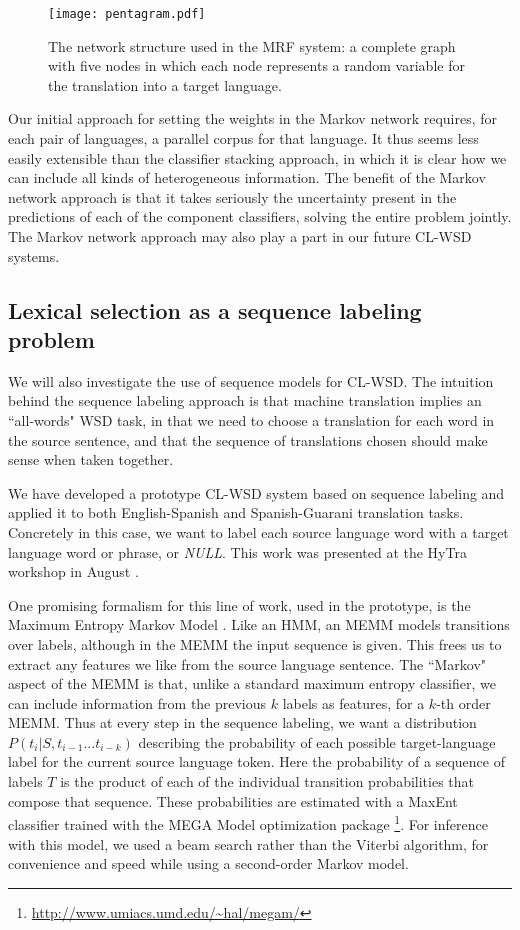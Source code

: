 \begin{figure}
  \begin{center}
  \texttt{[image: pentagram.pdf]}
  \end{center}
  \caption{The network structure used in the MRF system: a complete graph with
  five nodes in which each node represents a random variable for the
  translation into a target language.}
  \label{fig:pentagram}
\end{figure}

Our initial approach for setting the weights in the Markov network requires,
for each pair of languages, a parallel corpus for that language. It thus seems
less easily extensible than the classifier stacking approach, in which it is
clear how we can include all kinds of heterogeneous information.
The benefit of the Markov network approach is that it takes seriously the
uncertainty present in the predictions of each of the component classifiers,
solving the entire problem jointly.
The Markov network approach may also play a part in our future CL-WSD systems.

\subsection{Lexical selection as a sequence labeling problem}
We will also investigate the use of sequence models for CL-WSD.
The intuition behind the sequence labeling approach is that machine translation
implies an ``all-words" WSD task, in that we need to choose a translation for
each word in the source sentence, and that the sequence of translations chosen
should make sense when taken together.

We have developed a prototype CL-WSD system based on sequence labeling and
applied it to both English-Spanish and Spanish-Guarani translation tasks.
Concretely in this case, we want to label each source language word with a
target language word or phrase, or \emph{NULL}.
This work was presented at the HyTra workshop in August
\cite{rudnick-gasser:2013:HyTra-2013}.

One promising formalism for this line of work, used in the prototype, is the
Maximum Entropy Markov Model \cite{icml00/mccallum}.
Like an HMM, an MEMM models transitions over labels, although in the MEMM the
input sequence is given.
This frees us to extract any features we like from the source language
sentence. The ``Markov" aspect of the MEMM is that, unlike a standard maximum
entropy classifier, we can include information from the previous $k$ labels as
features, for a $k$-th order MEMM.
Thus at every step in the sequence labeling, we want a distribution
$P(t_i | S, t_{i-1}...t_{i-k})$ describing the probability of each possible
target-language label for the current source language token.
Here the probability of a sequence of labels $T$ is the product of each of the
individual transition probabilities that compose that sequence.
These probabilities are estimated with a MaxEnt classifier trained with 
the MEGA Model optimization package
\footnote{\url{http://www.umiacs.umd.edu/~hal/megam/}}.
For inference with this model, we used a beam search rather than the Viterbi
algorithm, for convenience and speed while using a second-order Markov model.

